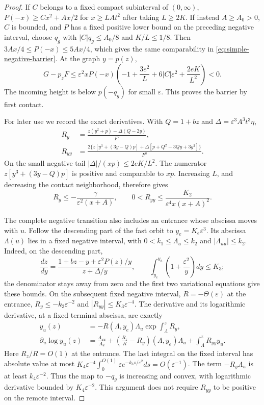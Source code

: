 \begin{proof}
If $C$ belongs to a fixed compact subinterval of $(0,\infty)$,
$P(-x)\ge Cx^2+Ax/2$ for $x\ge LAt^2$ after taking $L\ge2K$.
If instead $A\ge A_0>0$, $C$ is bounded, and $P$ has a fixed positive
lower bound on the preceding negative interval, choose $q_g$ with
$|C|q_g\le A_0/8$ and
$K/L\le1/8$.  Then
$3Ax/4\le P(-x)\le5Ax/4$, which gives the same comparability in
\eqref{eq:simple-negative-barrier}.  At the graph $y=p(z)$,
\[
 G-p_zF\le\varepsilon^2xP(-x)
 \left(-1+\frac{3e^2}{L}+6|C|\varepsilon^2
                  +\frac{2eK}{L^2}\right)<0.
\]
The incoming height is below $p(-q_g)$ for small $\varepsilon$.
This proves the barrier by first contact.

For later use we record the exact derivatives.  With $Q=1+bz$ and
$\Delta=\varepsilon^3A^3t^3\eta$,
\begin{align}
 R_y&=\frac{z(y^2+p)-\Delta(Q-2y)}{F^2},\label{eq:simple-Ry}\\
 R_{yy}&=\frac{2\{z[y^3+(3y-Q)p]
              +\Delta[p+Q^2-3Qy+3y^2]\}}{F^3}.
              \label{eq:simple-Ryy}
\end{align}
On the small negative tail $|\Delta|/(xp)\le2eK/L^2$.
The numerator $z[y^3+(3y-Q)p]$ is positive and comparable to $xp$.
Increasing $L$, and decreasing the contact neighborhood, therefore gives
\begin{equation}\label{eq:simple-tail-density}
 R_y\le-\frac{\gamma}{\varepsilon^2(x+A)},\qquad
 0<R_{yy}\le\frac{K_2}{\varepsilon^4x(x+A)^2}.
\end{equation}

The complete negative transition also includes an entrance whose
abscissa moves with $u$.
Follow the descending part of the fast orbit to
$y_e=K_e\varepsilon^3$.  Its abscissa $\Lambda(u)$ lies in a fixed
negative interval, with $0<k_1\le\Lambda_u\le k_2$ and
$|\Lambda_{uu}|\le k_2$.  Indeed, on the descending part,
\[
 \frac{dz}{dy}=
 \frac{1+bz-y+\varepsilon^2P(z)/y}{z+\Delta/y},
 \qquad
 \int_{y_e}^{y_h}\left(1+\frac{\varepsilon^2}{y}\right)dy\le K_3;
\]
the denominator stays away from zero and the first two variational
equations give these bounds.  On the subsequent fixed negative interval,
$R=-\Theta(\varepsilon)$ at the entrance,
$R_y\le-k_3\varepsilon^{-2}$ and
$|R_{yy}|\le K_3\varepsilon^{-4}$.  The derivative and its logarithmic
derivative, at a fixed terminal abscissa, are exactly
\begin{align}
 y_u(z)&=-R(\Lambda,y_e)\Lambda_u
                   \exp\!\int_\Lambda^zR_y,\label{eq:simple-moving-first}\\
 \partial_u\log y_u(z)&=
 \frac{\Lambda_{uu}}{\Lambda_u}
 +\left(\frac{R_z}{R}-R_y\right)(\Lambda,y_e)\Lambda_u
 +\int_\Lambda^zR_{yy}y_u.\label{eq:simple-moving-second}
\end{align}
Here $R_z/R=O(1)$ at the entrance.  The last integral on the fixed
interval has absolute value at most
$K_4\varepsilon^{-4}\int_0^{O(1)}\varepsilon
e^{-k_3s/\varepsilon^2}ds=O(\varepsilon^{-1})$.
The term $-R_y\Lambda_u$ is at least $k_4\varepsilon^{-2}$.
Thus the map to $-q_g$ is increasing and convex, with logarithmic
derivative bounded by $K_4\varepsilon^{-2}$.  This argument does not
require $R_{yy}$ to be positive on the remote interval.


\end{proof}
